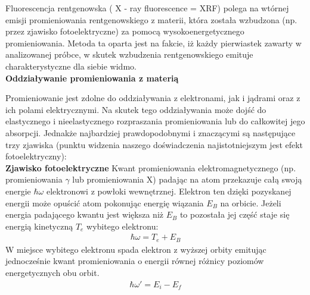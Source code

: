 \documentclass{article}
\begin{document}
\begin{enumerate}
Fluorescencja rentgenowska ( X - ray fluorescence = XRF) polega na wtórnej emisji promieniowania rentgenowskiego z materii, która została wzbudzona (np. przez zjawisko fotoelektryczne) za pomocą wysokoenergetycznego promieniowania. Metoda ta oparta jest na fakcie, iż każdy pierwiastek zawarty w analizowanej próbce, w skutek wzbudzenia rentgenowskiego emituje charakterystyczne dla siebie widmo.\\

{\bf Oddziaływanie promieniowania z materią}

Promieniowanie jest zdolne do oddziaływania z elektronami, jak i jądrami oraz z ich polami elektrycznymi. Na skutek tego oddziaływania może dojść do elastycznego i nieelastycznego rozpraszania promieniowania lub do całkowitej jego absorpcji. Jednakże najbardziej prawdopodobnymi i znaczącymi są następujące trzy zjawiska (punktu widzenia naszego doświadczenia najistotniejszym jest efekt fotoelektryczny):\\

{\bf Zjawisko fotoelektryczne}
Kwant promieniowania elektromagnetycznego (np. promieniowania $\gamma$ lub promieniowania X) padając na atom przekazuje całą swoją energie $\hbar\omega$ elektronowi z powłoki wewnętrznej. Elektron ten dzięki pozyskanej energii może opuścić atom pokonując energię wiązania $E_B$ na orbicie. Jeżeli energia padającego kwantu jest większa niż $E_B$ to pozostała jej część staje się energią kinetyczną $T_e$ wybitego elektronu:
\begin{gather*}
\hbar\omega=T_e+E_B
\end{gather*}
W miejsce wybitego elektronu spada elektron z wyższej orbity emitując jednocześnie kwant promieniowania o energii równej różnicy poziomów energetycznych obu orbit.
\begin{gather*}
\hbar\omega'=E_i-E_f
\end{gather*}


\end{enumerate}
\end{document}
